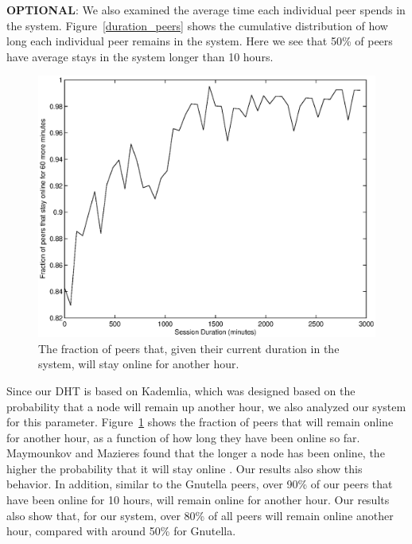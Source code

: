\documentclass[conference]{IEEEtran}
\begin{document}
\textbf{OPTIONAL}: We also examined the average time each individual peer spends in the
system. Figure~\ref{duration_peers} shows the cumulative
distribution of how long each individual peer remains in the system.
Here we see that 50\% of peers have average stays in the system
longer than 10 hours.

\begin{figure}
\centering
\includegraphics[width=\columnwidth]{AptP2PDuration-online_1.eps}
\caption{The fraction of peers that, given their current duration in
the system, will stay online for another hour.}
\label{duration_online_1}
\end{figure}

Since our DHT is based on Kademlia, which was designed based on the
probability that a node will remain up another hour, we also
analyzed our system for this parameter.
Figure~\ref{duration_online_1} shows the fraction of peers that will
remain online for another hour, as a function of how long they have
been online so far. Maymounkov and Mazieres found that the longer a
node has been online, the higher the probability that it will stay
online \cite{kademlia}. Our results also show this behavior. In
addition, similar to the Gnutella peers, over 90\% of our peers that
have been online for 10 hours, will remain online for another hour.
Our results also show that, for our system, over 80\% of all peers
will remain online another hour, compared with around 50\% for
Gnutella.
\end{document}
